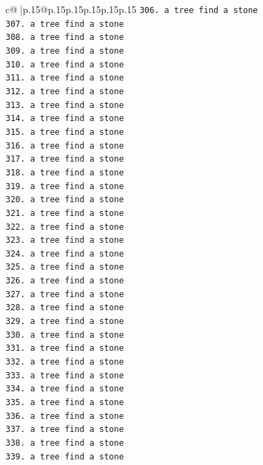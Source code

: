 \documentclass{article}
\begin{document}
{\begin{supertabular}{c@{$\;$}|p{.15\linewidth}@{}p{.15\linewidth}p{.15\linewidth}p{.15\linewidth}p{.15\linewidth}p{.15\linewidth}}
{{{\texttt{306. a tree find a stone} \\
\texttt{307. a tree find a stone} \\
\texttt{308. a tree find a stone} \\
\texttt{309. a tree find a stone} \\
\texttt{310. a tree find a stone} \\
\texttt{311. a tree find a stone} \\
\texttt{312. a tree find a stone} \\
\texttt{313. a tree find a stone} \\
\texttt{314. a tree find a stone} \\
\texttt{315. a tree find a stone} \\
\texttt{316. a tree find a stone} \\
\texttt{317. a tree find a stone} \\
\texttt{318. a tree find a stone} \\
\texttt{319. a tree find a stone} \\
\texttt{320. a tree find a stone} \\
\texttt{321. a tree find a stone} \\
\texttt{322. a tree find a stone} \\
\texttt{323. a tree find a stone} \\
\texttt{324. a tree find a stone} \\
\texttt{325. a tree find a stone} \\
\texttt{326. a tree find a stone} \\
\texttt{327. a tree find a stone} \\
\texttt{328. a tree find a stone} \\
\texttt{329. a tree find a stone} \\
\texttt{330. a tree find a stone} \\
\texttt{331. a tree find a stone} \\
\texttt{332. a tree find a stone} \\
\texttt{333. a tree find a stone} \\
\texttt{334. a tree find a stone} \\
\texttt{335. a tree find a stone} \\
\texttt{336. a tree find a stone} \\
\texttt{337. a tree find a stone} \\
\texttt{338. a tree find a stone} \\
\texttt{339. a tree find a stone} \\
}}}
\end{supertabular}}
\end{document}
